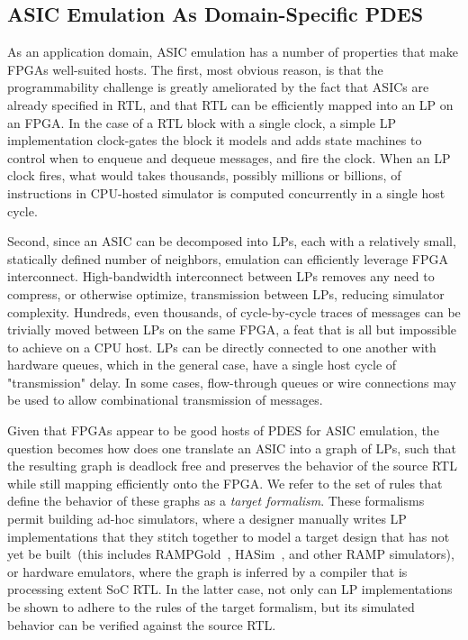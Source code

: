 \subsection{ASIC Emulation As Domain-Specific PDES}

As an application domain, ASIC emulation has a number of properties that make
FPGAs well-suited hosts. The first, most obvious reason, is that the programmability challenge is
greatly ameliorated by the fact that ASICs are already specified in RTL, and
that RTL can be efficiently mapped into an LP on an FPGA. In the case of a RTL block with a single clock, a
simple LP implementation clock-gates the block it models and adds state
machines to control when to enqueue and dequeue messages, and fire the clock.
When an LP clock fires, what would takes thousands, possibly
millions or billions, of instructions in CPU-hosted simulator is computed
concurrently in a single host cycle.

Second, since an ASIC can be decomposed into LPs, each with a relatively small,
statically defined number of neighbors, emulation can efficiently leverage FPGA
interconnect. High-bandwidth interconnect between LPs removes any need to compress, or
otherwise optimize, transmission between LPs, reducing simulator complexity.
Hundreds, even thousands, of cycle-by-cycle traces of messages can be trivially
moved between LPs on the same FPGA, a feat that is all but impossible to
achieve on a CPU host. LPs can be directly connected to one another with
hardware queues, which in the general case, have a single host cycle of
"transmission" delay. In some cases, flow-through queues or wire connections
may be used to allow combinational transmission of messages.

Given that FPGAs appear to be good hosts of PDES for ASIC emulation,
the question becomes how does one translate an ASIC into a graph of
LPs, such that the resulting graph is deadlock free and preserves the behavior of the source RTL while still mapping
efficiently onto the FPGA. We refer to the set of rules that define the
behavior of these graphs as a \emph{target formalism}.
These formalisms permit building ad-hoc simulators, where a designer manually
writes LP implementations that they stitch together to model a target design
that has not yet be built~(this includes RAMPGold~\cite{RAMPGold},
HASim~\cite{HASim}, and other RAMP simulators), or hardware emulators, where
the graph is inferred by a compiler that is processing extent SoC RTL. In
the latter case, not only can LP implementations be shown to adhere to the
rules of the target formalism, but its simulated behavior can be verified
against the source RTL.

